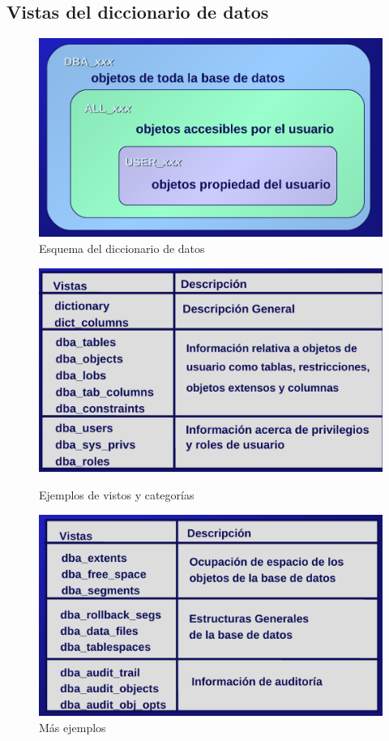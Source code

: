 \subsection{Vistas del diccionario de datos}

\begin{figure}[H]
  \center
  \includegraphics[scale=0.25]{img/p23.png}
  \caption{Esquema del diccionario de datos}
\end{figure}
\begin{figure}[H]
  \center
  \includegraphics[scale=0.2]{img/p24.png}
  \caption{Ejemplos de vistos y categorías}
  \includegraphics[scale=0.2]{img/p25.png}
  \caption{Más ejemplos}
\end{figure}